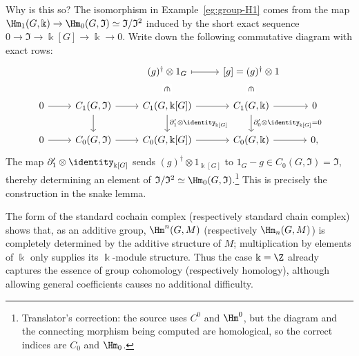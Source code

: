 \begin{example}
	Why is this so? The isomorphism in Example~\ref{eg:group-H1} comes from
	the map $\Hm_1(G,\Bbbk)\to\Hm_0(G,\mathfrak{I})\simeq
	\mathfrak{I}/\mathfrak{I}^2$ induced by the short exact sequence
	$0\to\mathfrak{I}\to\Bbbk[G]\to\Bbbk\to0$. Write down the following
	commutative diagram with exact rows:
	\[\begin{tikzcd}
		& & {(g)^\dagger \otimes 1_G} \arrow[phantom, d, "\in" description, sloped] \arrow[mapsto, r] & {[g] = (g)^\dagger \otimes 1} \arrow[phantom, d, "\in" description, sloped] & \\
		0 \arrow[r] & C_1(G, \mathfrak{I}) \arrow[r] \arrow[d] & C_1(G, \Bbbk[G]) \arrow[r] \arrow[d, "{\partial'_1 \otimes \identity_{\Bbbk[G]}}"] & C_1(G, \Bbbk) \arrow[r] \arrow[d, "{\partial'_0 \otimes \identity_{\Bbbk[G]} = 0}"] & 0 \\
		0 \arrow[r] & C_0(G, \mathfrak{I}) \arrow[r] & C_0(G, \Bbbk[G]) \arrow[r] & C_0(G, \Bbbk) \arrow[r] & 0 ,
	\end{tikzcd}\]
	The map $\partial'_1\otimes\identity_{\Bbbk[G]}$ sends
	$(g)^\dagger\otimes1_{\Bbbk[G]}$ to
	$1_G-g\in C_0(G,\mathfrak{I})=\mathfrak{I}$, thereby determining an
	element of $\mathfrak{I}/\mathfrak{I}^2\simeq
	\Hm_0(G,\mathfrak{I})$.\footnote{Translator's correction: the source uses
	$C^0$ and $\Hm^0$, but the diagram and the connecting morphism being
	computed are homological, so the correct indices are $C_0$ and $\Hm_0$.}
	This is precisely the construction in the snake lemma.
\end{example}

\begin{remark}\label{rem:Gmod-k}
	The form of the standard cochain complex (respectively standard chain
	complex) shows that, as an additive group, $\Hm^n(G,M)$ (respectively
	$\Hm_n(G,M)$) is completely determined by the additive structure of $M$;
	multiplication by elements of $\Bbbk$ only supplies its $\Bbbk$-module
	structure. Thus the case $\Bbbk=\Z$ already captures the essence of group
	cohomology (respectively homology), although allowing general coefficients
	causes no additional difficulty.
\end{remark}

